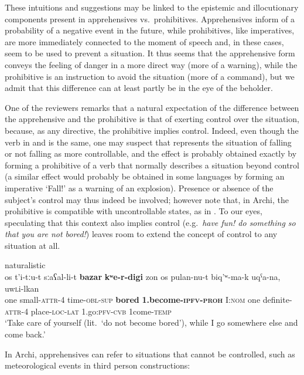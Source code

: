 \documentclass[output=paper,colorlinks,citecolor=brown]{langscibook}
\begin{document}
 These intuitions and suggestions may be linked to the epistemic and illocutionary components present in apprehensives vs.\ prohibitives. Apprehensives inform of a probability of a negative event in the future, while prohibitives, like imperatives, are more immediately connected to the moment of speech and, in these cases, seem to be used to prevent a situation. It thus seems that the apprehensive form conveys the feeling of danger in a more direct way (more of a warning), while the prohibitive is an instruction to avoid the situation (more of a command), but we admit that this difference can at least partly be in the eye of the beholder. 

One of the reviewers remarks that a natural expectation of the difference between the apprehensive and the prohibitive is that of exerting control over the situation, because, as any directive, the prohibitive implies control. Indeed, even though the verb in  and  is the same, one may suspect that  represents the situation of falling or not falling as more controllable, and the effect is probably obtained exactly by forming a prohibitive of a verb that normally describes a situation beyond control (a similar effect would probably be obtained in some languages by forming an imperative `Fall!' as a warning of an explosion).  Presence or absence of the subject's control may thus indeed be involved; however note that, in Archi, the prohibitive is compatible with uncontrollable states, as in . To our eyes, speculating that this context also implies control (e.g.\ \textit{have fun! do something so that you are not bored!}) leaves room to extend the concept of control to any situation at all.


\ea \label{ex:DD7} \textnormal{naturalistic}\\
\gll os t'i-tːu-t sːaʕal-li-t \textbf{bazar} \textbf{kʷe-r-digi} zon os pulan-nu-t biq'ʷ-ma-k uqˁa-na, u{\textlangle}w{\textrangle}\textsc{l}i-lkan\\
one small-\textsc{attr}-4 time-\textsc{obl-sup} \textbf{bored} \textbf{1.become-\textsc{ipfv-proh}} I:\textsc{nom} one definite-\textsc{attr}-4 place-\textsc{loc-lat} 1.go:\textsc{pfv-cvb} {\textlangle}1{\textrangle}come-\textsc{temp}\\
\glt `Take care of yourself (lit.\ `do not become bored'), while I go somewhere else and come back.'
\z

 In Archi, apprehensives can refer to situations that cannot be controlled, such as meteorological events in third person constructions:
\end{document}
